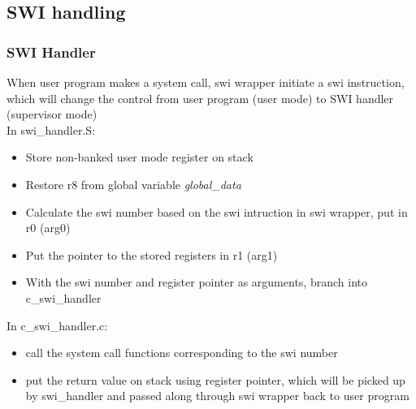 \documentclass{article}
\begin{document}
\subsection{SWI handling}
\subsubsection{SWI Handler}
	When user program makes a system call, swi wrapper initiate a swi instruction, which will change the control from user program (user mode) to SWI handler (supervisor mode)\\
\newline
In swi\_handler.S:
	 \begin{itemize}
	  \setlength{\itemsep}{1pt}
	  \setlength{\parskip}{0pt}
	  \setlength{\parsep}{0pt}
	\item Store non-banked user mode register on stack
	\item Restore r8 from global variable {\it global\_data}
	\item Calculate the swi number based on the swi intruction in swi wrapper, put in r0 (arg0)
	\item Put the pointer to the stored registers in r1 (arg1)
	\item With the swi number and register pointer as arguments, branch into c\_swi\_handler
	\end{itemize}
In c\_swi\_handler.c:
	\begin{itemize}
	  \setlength{\itemsep}{1pt}
	  \setlength{\parskip}{0pt}
	  \setlength{\parsep}{0pt}
	\item call the system call functions corresponding to the swi number
	\item put the return value on stack using register pointer, which will be picked up by swi\_handler and passed along through swi wrapper back to user program 
	\end{itemize}
\end{document}
